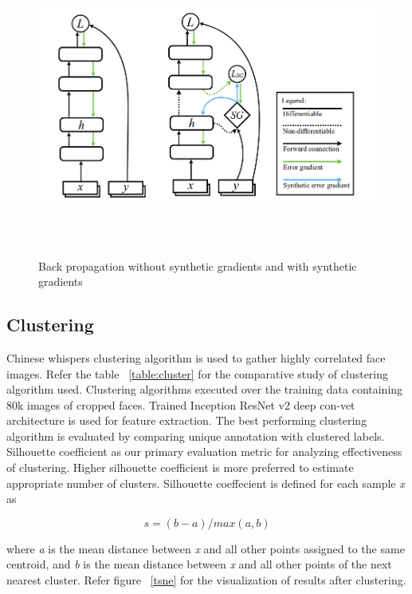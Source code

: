 \documentclass[a4paper,12pt, twoside]{NITKReport}
\begin{document}
 
\begin{figure} [h]
\centering
    \includegraphics[height=10cm,width=14cm]{Selection_039.png}
    \caption{Back propagation without synthetic gradients and with synthetic gradients}
    \label{synthetic_grad}
\end{figure}


\subsection{Clustering}
\par Chinese whispers clustering algorithm is used to gather highly correlated face images. Refer the table ~\ref{table:cluster} for the comparative study of clustering algorithm used. Clustering algorithms executed over the training data containing 80k images of cropped faces. Trained Inception ResNet v2 deep con-vet architecture is used for feature extraction. The best performing clustering algorithm is evaluated by comparing unique annotation with clustered labels. Silhouette coefficient as our primary evaluation metric for analyzing effectiveness of clustering. Higher silhouette coefficient is more preferred to estimate appropriate number of clusters. Silhouette coeffecient is defined for each sample \textit{x} as

\begin{equation}
s = (b-a)/max(a,b)
\end{equation}

\par where \textit{a} is the mean distance between \textit{x} and all other points
assigned to the same centroid, and \textit{b} is the mean distance between \textit{x} and all other points of the next nearest cluster. Refer figure ~\ref{tsne} for the visualization of results after clustering.
\end{document}
